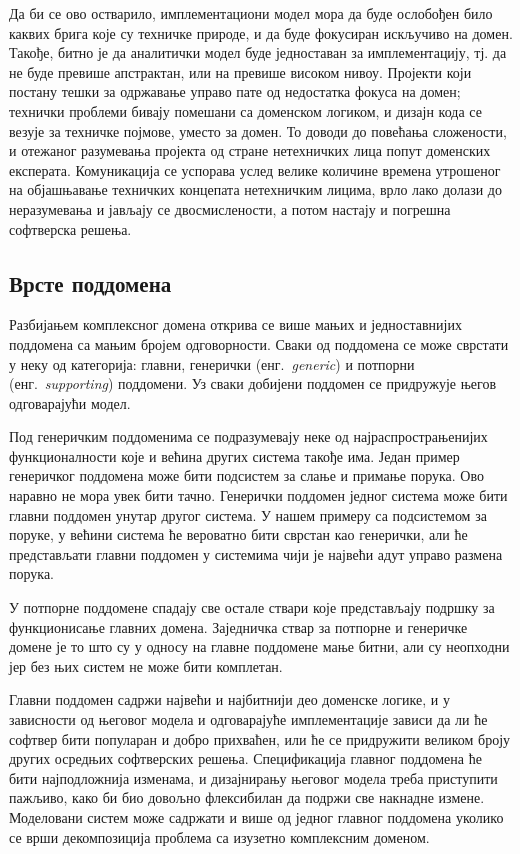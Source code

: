 \documentclass[12pt,oneside]{memoir}
\begin{document}
Да би се ово остварило, имплементациони модел мора да буде ослобођен било каквих брига које су техничке природе, и да буде фокусиран искључиво на домен. Такође, битно је да аналитички модел буде једноставан за имплементацију, тј. да не буде превише апстрактан, или на превише високом нивоу. Пројекти који постану тешки за одржавање управо пате од недостатка фокуса на домен; технички проблеми бивају помешани са доменском логиком, и дизајн кода се везује за техничке појмове, уместо за домен. То доводи до повећања сложености, и отежаног разумевања пројекта од стране нетехничких лица попут доменских експерата. Комуникација се успорава услед велике количине времена утрошеног на објашњавање техничких концепата нетехничким лицима, врло лако долази до неразумевања и јављају се двосмислености, а потом настају и погрешна софтверска решења.

\subsection{Врсте поддомена}
Разбијањем комплексног домена открива се више мањих и једноставнијих поддомена са мањим бројем одговорности. Сваки од поддомена се може сврстати у неку од категорија: главни, генерички (енг.~\textit{generic}) и потпорни (енг.~\textit{supporting}) поддомени. Уз сваки добијени поддомен се придружује његов одговарајући модел.

Под генеричким поддоменима се подразумевају неке од најраспрострањенијих функционалности које и већина других система такође има. Један пример генеричког поддомена може бити подсистем за слање и примање порука. Ово наравно не мора увек бити тачно. Генерички поддомен једног система може бити главни поддомен унутар другог система. У нашем примеру са подсистемом за поруке, у већини система ће вероватно бити сврстан као генерички, али ће представљати главни поддомен у системима чији је највећи адут управо размена порука.

У потпорне поддомене спадају све остале ствари које представљају подршку за функционисање главних домена. Заједничка ствар за потпорне и генеричке домене је то што су у односу на главне поддомене мање битни, али су неопходни јер без њих систем не може бити комплетан.

Главни поддомен садржи највећи и најбитнији део доменске логике, и у зависности од његовог модела и одговарајуће имплементације зависи да ли ће софтвер бити популаран и добро прихваћен, или ће се придружити великом броју других осредњих софтверских решења. Спецификација главног поддомена ће бити најподложнија изменама, и дизајнирању његовог модела треба приступити пажљиво, како би био довољно флексибилан да подржи све накнадне измене. Моделовани систем може садржати и више од једног главног поддомена уколико се врши декомпозиција проблема са изузетно комплексним доменом.
\end{document}
